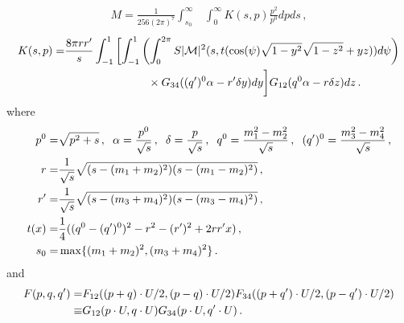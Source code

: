 \begin{align}\label{M:simp}
M=\frac{1}{256(2\pi)^7 }\int_{s_0}^\infty&\int_0^\infty K(s,p)\frac{ p^2}{p^0}dpds\,,
\end{align}
\begin{align}\label{matrixElemInt}
K(s,p)=&\frac{8\pi rr^{\prime}}{s}\int_{-1}^1 \left[\int_{-1}^1\left(\int_0^{2\pi} S |\mathcal{M}|^2 (s,t(\cos(\psi)\sqrt{1-y^2}\sqrt{1-z^2}+yz))d\psi\right)\right.\\
&\hspace{26mm}\times G_{34}((q^{\prime})^0\alpha-r^{\prime}\delta y) dy\bigg] G_{12}(q^0\alpha-r\delta z)dz\,.\notag
\end{align}
where
\begin{align}\label{tDef}
p^0=&\sqrt{p^2+s}\,,\hspace{2mm} \alpha=\frac{p^0}{\sqrt{s}}\,, \hspace{2mm} \delta=\frac{p}{\sqrt{s}}\,,\hspace{2mm}q^{0}=\frac{m_1^2-m_2^2}{\sqrt{s}}\,,\hspace{2mm}(q^{\prime})^{0}=\frac{m_3^2-m_4^2}{\sqrt{s}}\,,\\
r=&\frac{1}{\sqrt{s}}\sqrt{(s-(m_1+m_2)^2)(s-(m_1-m_2)^2)}\,,\notag\\
 r^{\prime}=&\frac{1}{\sqrt{s}}\sqrt{(s-(m_3+m_4)^2)(s-(m_3-m_4)^2)}\,,\notag\\
t(x)=&\frac{1}{4}((q^0-(q^{\prime})^0)^2-r^2-(r^{\prime})^2+2rr^{\prime}x)\,,\notag\\
s_0=&\max\{(m_1+m_2)^2,(m_3+m_4)^2\}\,.\notag
\end{align}
and
\begin{align}
 F(p,q,q^{\prime})=&F_{12}((p+q)\cdot U/2,(p-q)\cdot U/2)F_{34}((p+q^{\prime})\cdot U/2,(p-q^{\prime})\cdot U/2)\\
\equiv &G_{12}(p\cdot U,q\cdot U)G_{34}(p\cdot U,q^{\prime}\cdot U)\notag\,.
\end{align}

